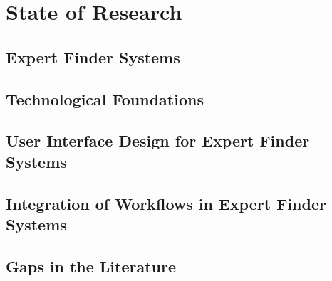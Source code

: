 \newpage
\section{State of Research} 

\subsection{Expert Finder Systems}

\subsection{Technological Foundations}

\subsection{User Interface Design for Expert Finder Systems} 

\subsection{Integration of Workflows in Expert Finder Systems}

\subsection{Gaps in the Literature}


